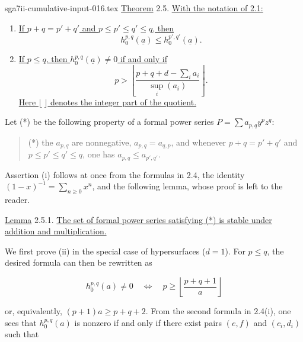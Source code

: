 \begin{filecontents*}{sga7ii-cumulative-input-016.tex}
\underline{Theorem} 2.5. \underline{With the notation of 2.1:}

\begin{enumerate}[label=(\roman*),leftmargin=2.6em]
\item \underline{If $p+q=p'+q'$ and
$p\leq p'\leq q'\leq q$, then}
\begin{equation*}
h_0^{p,q}(\underline a)\leq h_0^{p',q'}(\underline a).
\end{equation*}

\item \underline{If $p\leq q$, then $h_0^{p,q}(\underline a)\ne0$ if
and only if}
\begin{equation*}
p>\left\lfloor
\frac{p+q+d-\sum_i a_i}{\sup_i(a_i)}
\right\rfloor.
\end{equation*}
\underline{Here $\lfloor\ \rfloor$ denotes the integer part of the
quotient.}
\end{enumerate}


Let (*) be the following property of a formal power series
$P=\sum a_{p,q}y^pz^q$:

\begin{quote}
(*) the $a_{p,q}$ are nonnegative, $a_{p,q}=a_{q,p}$, and whenever
$p+q=p'+q'$ and $p\leq p'\leq q'\leq q$, one has
$a_{p,q}\leq a_{p',q'}$.
\end{quote}

Assertion (i) follows at once from the formulas in 2.4, the identity
$(1-x)^{-1}=\sum_{n\geq0}x^n$, and the following lemma, whose proof is left
to the reader.

\underline{Lemma} 2.5.1. \underline{The set of formal power series
satisfying (*) is stable under addition and multiplication.}

We first prove (ii) in the special case of hypersurfaces ($d=1$).  For
$p\leq q$, the desired formula can then be rewritten as

\begin{equation}\tag{2.5.2}
h_0^{p,q}(a)\ne0
\quad\Longleftrightarrow\quad
p\geq\left\lfloor\frac{p+q+1}{a}\right\rfloor
\end{equation}

or, equivalently, $(p+1)a\geq p+q+2$.  From the second formula in 2.4(i),
one sees that $h_0^{p,q}(a)$ is nonzero if and only if there exist pairs
$(e,f)$ and $(c_i,d_i)$ such that


\end{filecontents*}
